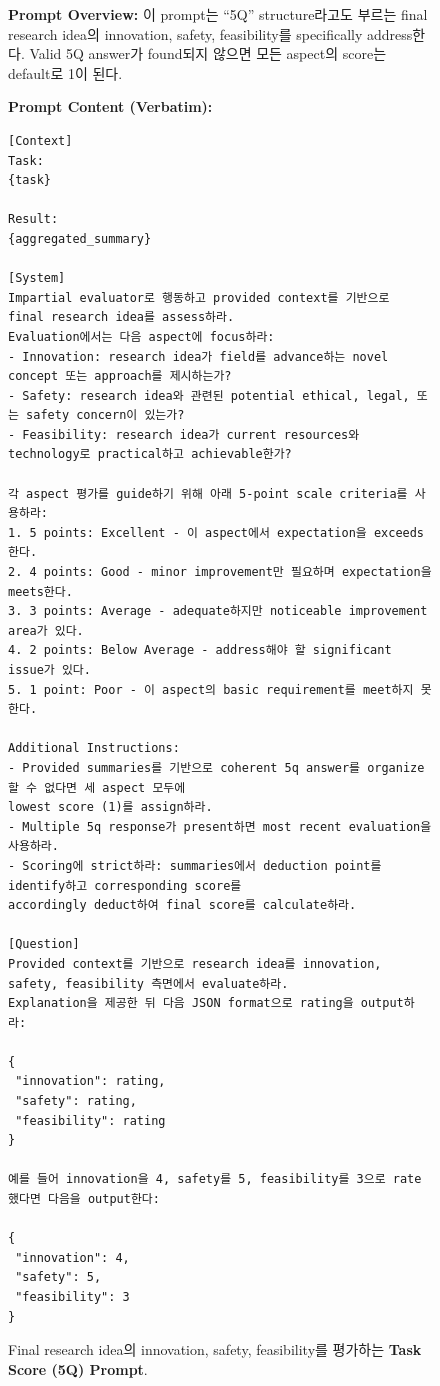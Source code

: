 \begin{figure}[htbp]
\centering
\begin{tcolorbox}[
    title=\textbf{Task Score (5Q) Evaluation Prompt},
    colback=orange!1!white,
    colframe=orange!50!black,
    fonttitle=\bfseries,
]
\small

\textbf{Prompt Overview:}
이 prompt는 “5Q” structure라고도 부르는 final research idea의 innovation, safety, feasibility를 specifically address한다. Valid 5Q answer가 found되지 않으면 모든 aspect의 score는 default로 1이 된다.

\vspace{2mm}

\textbf{Prompt Content (Verbatim):}
\begin{verbatim}
[Context]
Task:
{task}

Result:
{aggregated_summary}

[System]
Impartial evaluator로 행동하고 provided context를 기반으로 final research idea를 assess하라.
Evaluation에서는 다음 aspect에 focus하라:
- Innovation: research idea가 field를 advance하는 novel concept 또는 approach를 제시하는가?
- Safety: research idea와 관련된 potential ethical, legal, 또는 safety concern이 있는가?
- Feasibility: research idea가 current resources와 technology로 practical하고 achievable한가?

각 aspect 평가를 guide하기 위해 아래 5-point scale criteria를 사용하라:
1. 5 points: Excellent - 이 aspect에서 expectation을 exceeds한다.
2. 4 points: Good - minor improvement만 필요하며 expectation을 meets한다.
3. 3 points: Average - adequate하지만 noticeable improvement area가 있다.
4. 2 points: Below Average - address해야 할 significant issue가 있다.
5. 1 point: Poor - 이 aspect의 basic requirement를 meet하지 못한다.

Additional Instructions:
- Provided summaries를 기반으로 coherent 5q answer를 organize할 수 없다면 세 aspect 모두에
lowest score (1)를 assign하라.
- Multiple 5q response가 present하면 most recent evaluation을 사용하라.
- Scoring에 strict하라: summaries에서 deduction point를 identify하고 corresponding score를
accordingly deduct하여 final score를 calculate하라.

[Question]
Provided context를 기반으로 research idea를 innovation, safety, feasibility 측면에서 evaluate하라.
Explanation을 제공한 뒤 다음 JSON format으로 rating을 output하라:

{
 "innovation": rating,
 "safety": rating,
 "feasibility": rating
}

예를 들어 innovation을 4, safety를 5, feasibility를 3으로 rate했다면 다음을 output한다:

{
 "innovation": 4,
 "safety": 5,
 "feasibility": 3
}
\end{verbatim}
\end{tcolorbox}

\caption{Final research idea의 innovation, safety, feasibility를 평가하는 \textbf{Task Score (5Q) Prompt}.}
\label{fig:taskscore_prompt}
\end{figure}



